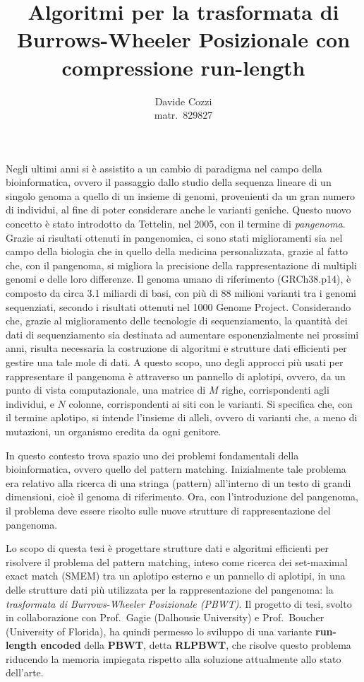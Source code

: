 \documentclass[a4paper,11pt, oneside,italian]{article}
\title{Algoritmi per la trasformata di Burrows-Wheeler
  Posizionale con compressione run-length}
\author{Davide Cozzi\\\smaller matr.~829827}
\date{}
\begin{document}
\maketitle
{}
\noindent
Negli ultimi anni si è assistito a un cambio di paradigma nel campo della
bioinformatica, ovvero il passaggio dallo studio della sequenza lineare di un
singolo genoma a quello di un insieme di genomi, provenienti da un gran numero
di individui, al fine di poter considerare anche le varianti
  geniche. Questo nuovo concetto è stato introdotto da
Tettelin, nel 2005, con il termine di \textit{pangenoma}. Grazie ai risultati
ottenuti in pangenomica, ci sono stati miglioramenti sia nel 
campo della biologia che in quello della medicina personalizzata, grazie al
fatto che, con il pangenoma, si migliora la precisione della rappresentazione di
multipli genomi e delle loro differenze. 
Il genoma umano di riferimento (GRCh38.p14), è composto da circa
3.1 miliardi di basi, con più di 88 milioni 
varianti tra i genomi sequenziati, secondo i risultati ottenuti nel 1000 Genome
Project. Considerando che, grazie al
miglioramento delle tecnologie di sequenziamento, la quantità dei dati di
sequenziamento sia destinata 
ad aumentare esponenzialmente nei prossimi anni, risulta necessaria la
costruzione di algoritmi e   
strutture dati efficienti per gestire una tale mole di dati.
A questo scopo, uno degli approcci più usati per rappresentare il pangenoma è
attraverso un 
pannello di aplotipi, ovvero, da un punto di vista computazionale, una matrice
di $M$ 
righe, corrispondenti agli individui, e $N$ colonne, corrispondenti ai siti con
le varianti. Si specifica che, con il termine
aplotipo, si intende l'insieme di alleli, ovvero di varianti che, a meno di
mutazioni, un organismo eredita da ogni genitore.

In questo contesto trova spazio uno dei problemi fondamentali della
bioinformatica, ovvero quello del pattern matching. Inizialmente tale problema
era relativo alla ricerca di una stringa (pattern) all'interno di un testo di
grandi dimensioni, cioè il genoma di riferimento.
Ora, con l'introduzione del pangenoma, il problema deve essere risolto sulle
nuove strutture 
di rappresentazione del pangenoma.

Lo scopo di questa tesi è progettare strutture dati e algoritmi efficienti per
risolvere il problema del pattern 
matching, inteso come ricerca dei set-maximal exact match (SMEM) tra un aplotipo
esterno e un pannello di aplotipi, in una delle 
strutture dati più utilizzata per la rappresentazione del pangenoma: la
\textit{trasformata di Burrows-Wheeler 
  Posizionale (PBWT)}. Il progetto di tesi, svolto in collaborazione con
Prof.~Gagie (Dalhousie University) e Prof.~Boucher 
(University of Florida), ha quindi permesso lo sviluppo di una variante
\textbf{run-length encoded} della \textbf{PBWT}, detta \textbf{RLPBWT}, che
risolve questo problema riducendo la memoria impiegata rispetto
alla soluzione attualmente allo stato dell'arte.
\end{document}
